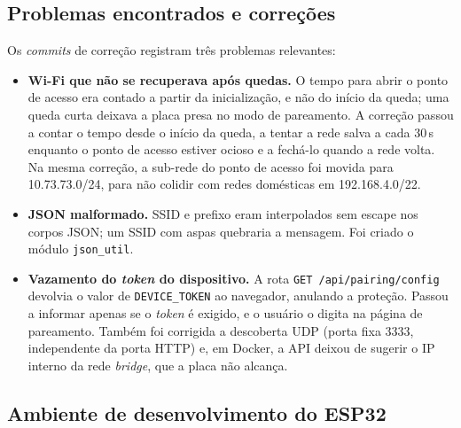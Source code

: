 \subsection{Problemas encontrados e correções}

Os \textit{commits} de correção registram três problemas relevantes:

\begin{itemize}
  \item \textbf{Wi-Fi que não se recuperava após quedas.} O tempo para abrir o ponto de acesso era contado a partir da inicialização, e não do início da queda; uma queda curta deixava a placa presa no modo de pareamento. A correção passou a contar o tempo desde o início da queda, a tentar a rede salva a cada 30\,s enquanto o ponto de acesso estiver ocioso e a fechá-lo quando a rede volta. Na mesma correção, a sub-rede do ponto de acesso foi movida para 10.73.73.0/24, para não colidir com redes domésticas em 192.168.4.0/22.
  \item \textbf{JSON malformado.} SSID e prefixo eram interpolados sem escape nos corpos JSON; um SSID com aspas quebraria a mensagem. Foi criado o módulo \texttt{json\_util}.
  \item \textbf{Vazamento do \textit{token} do dispositivo.} A rota \texttt{GET /api/pairing/config} devolvia o valor de \texttt{DEVICE\_TOKEN} ao navegador, anulando a proteção. Passou a informar apenas se o \textit{token} é exigido, e o usuário o digita na página de pareamento. Também foi corrigida a descoberta UDP (porta fixa 3333, independente da porta HTTP) e, em Docker, a API deixou de sugerir o IP interno da rede \textit{bridge}, que a placa não alcança.
\end{itemize}

\subsection{Ambiente de desenvolvimento do ESP32}

